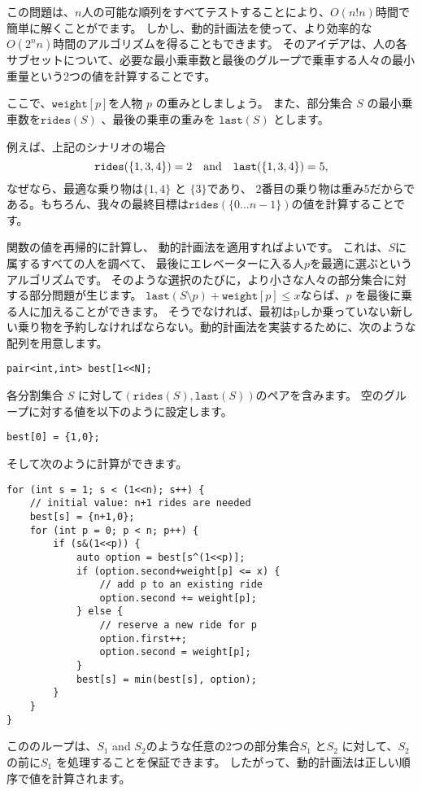 この問題は、$n$人の可能な順列をすべてテストすることにより、$O(n! n)$時間で簡単に解くことがでます。
しかし、動的計画法を使って、より効率的な$O(2^n n)$時間のアルゴリズムを得ることもできます。
そのアイデアは、人の各サブセットについて、必要な最小乗車数と最後のグループで乗車する人々の最小重量という2つの値を計算することです。

ここで、$\texttt{weight}[p]$を人物 $p$ の重みとしましょう。
また、部分集合 $S$ の最小乗車数を$\texttt{rides}(S)$ 、最後の乗車の重みを $\texttt{last}(S)$  とします。

例えば、上記のシナリオの場合
\[ \texttt{rides}(\{1,3,4\})=2 \hspace{10px} \textrm{and}
\hspace{10px} \texttt{last}(\{1,3,4\})=5,\]
なぜなら、最適な乗り物は$\{1,4\}$ と $\{3\}$であり、
2番目の乗り物は重み5だからである。もちろん、我々の最終目標は$\texttt{rides}(\{0 \ldots n-1\})$の値を計算することです。

関数の値を再帰的に計算し、
動的計画法を適用すればよいです。
これは、$S$に属するすべての人を調べて、
最後にエレベーターに入る人$p$を最適に選ぶというアルゴリズムです。
そのような選択のたびに，より小さな人々の部分集合に対する部分問題が生じます。
$\texttt{last}(S \setminus p)+\texttt{weight}[p] \le x$ならば、$p$ を最後に乗る人に加えることができます。
そうでなければ、最初はpしか乗っていない新しい乗り物を予約しなければならない。動的計画法を実装するために、次のような配列を用意します。
\begin{lstlisting}
pair<int,int> best[1<<N];
\end{lstlisting}
各分割集合 $S$ に対して$(\texttt{rides}(S),\texttt{last}(S))$のペアを含みます。
空のグループに対する値を以下のように設定します。
\begin{lstlisting}
best[0] = {1,0};
\end{lstlisting}
そして次のように計算ができます。
\begin{lstlisting}
for (int s = 1; s < (1<<n); s++) {
    // initial value: n+1 rides are needed
    best[s] = {n+1,0};
    for (int p = 0; p < n; p++) {
        if (s&(1<<p)) {
            auto option = best[s^(1<<p)];
            if (option.second+weight[p] <= x) {
                // add p to an existing ride
                option.second += weight[p];
            } else {
                // reserve a new ride for p
                option.first++;
                option.second = weight[p];
            }
            best[s] = min(best[s], option);
        }
    }
}
\end{lstlisting}
こののループは、$S_1$ and $S_2$のような任意の2つの部分集合$S_1$ と$S_2$
に対して、$S_2$ の前に$S_1$ を処理することを保証できます。
したがって、動的計画法は正しい順序で値を計算されます。

